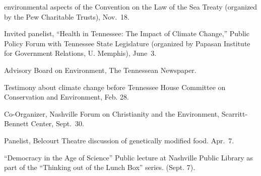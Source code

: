   environmental aspects of the Convention on the Law of the Sea Treaty
  (organized by the Pew Charitable Trusts), Nov.~18.
\item[2009] Invited panelist, ``Health in Tennessee: The Impact of Climate
  Change,'' Public Policy Forum with Tennessee State Legislature (organized by
  Papasan Institute for Government Relations, U. Memphis), June~3.
\item[2007--2009] Advisory Board on Environment, The Tennessean Newspaper.
\item[2008] Testimony about climate change before Tennessee House Committee on
  Conservation and Environment, Feb. 28.
\item[2006] Co-Organizer, Nashville Forum on Christianity and the Environment,
  Scarritt-Bennett Center, Sept.~30.
\item[2006] Panelist, Belcourt Theatre discussion of genetically modified food.
  Apr.~7.
\item[2005] ``Democracy in the Age of Science'' Public lecture at Nashville
  Public Library as part of the ``Thinking out of the Lunch Box'' series.
  (Sept. 7).
